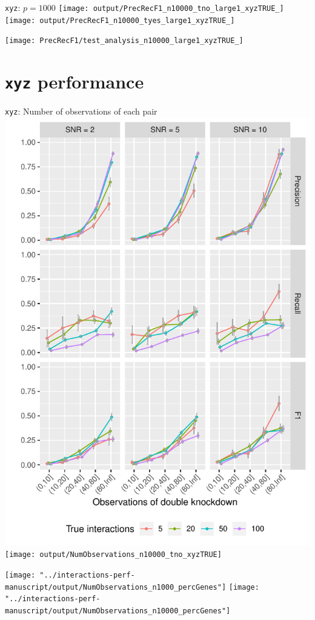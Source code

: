 \begin{frame}{\texttt{xyz}: $p = 1000$}
\texttt{[image: output/PrecRecF1\_n10000\_tno\_large1\_xyzTRUE\_]}%
\texttt{[image: output/PrecRecF1\_n10000\_tyes\_large1\_xyzTRUE\_]}
\end{frame}

\begin{frame}
\centering
\texttt{[image: PrecRecF1/test\_analysis\_n10000\_large1\_xyzTRUE\_]}
\end{frame}



\section{\texttt{xyz} performance}

\begin{frame}{\texttt{xyz}: Number of observations of each pair}
\includegraphics[width=0.5\linewidth]{output/NumObservations_n1000_tno_xyzTRUE}%
\texttt{[image: output/NumObservations\_n10000\_tno\_xyzTRUE]}%
\end{frame}


\begin{frame}
\texttt{[image: "../interactions-perf-manuscript/output/NumObservations\_n1000\_percGenes"]}%
\texttt{[image: "../interactions-perf-manuscript/output/NumObservations\_n10000\_percGenes"]}
\end{frame}

